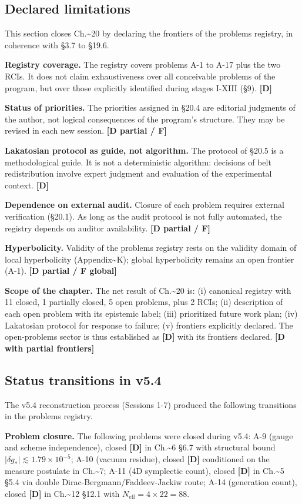 ﻿\documentclass[11pt,letterpaper]{article}
\begin{document}
\subsection{Declared limitations}
This section closes Ch.\textasciitilde{}20 by declaring the frontiers of the problems registry, in coherence with §3.7 to §19.6.

\textbf{Registry coverage.} The registry covers problems A-1 to A-17 plus the two RCIs. It does not claim exhaustiveness over all conceivable problems of the program, but over those explicitly identified during stages I-XIII (§9). \textbf{[D]}

\textbf{Status of priorities.} The priorities assigned in §20.4 are editorial judgments of the author, not logical consequences of the program's structure. They may be revised in each new session. \textbf{[D partial / F]}

\textbf{Lakatosian protocol as guide, not algorithm.} The protocol of §20.5 is a methodological guide. It is not a deterministic algorithm: decisions of belt redistribution involve expert judgment and evaluation of the experimental context. \textbf{[D]}

\textbf{Dependence on external audit.} Closure of each problem requires external verification (§20.1). As long as the audit protocol is not fully automated, the registry depends on auditor availability. \textbf{[D partial / F]}

\textbf{Hyperbolicity.} Validity of the problems registry rests on the validity domain of local hyperbolicity (Appendix\textasciitilde{}K); global hyperbolicity remains an open frontier (A-1). \textbf{[D partial / F global]}

\textbf{Scope of the chapter.} The net result of Ch.\textasciitilde{}20 is: (i) canonical registry with 11 closed, 1 partially closed, 5 open problems, plus 2 RCIs; (ii) description of each open problem with its epistemic label; (iii) prioritized future work plan; (iv) Lakatosian protocol for response to failure; (v) frontiers explicitly declared. The open-problems sector is thus established as \textbf{[D]} with its frontiers declared. \textbf{[D with partial frontiers]}
\subsection{Status transitions in v5.4}
The v5.4 reconstruction process (Sessions 1-7) produced the following transitions in the problems registry.

\textbf{Problem closure.} The following problems were closed during v5.4: A-9 (gauge and scheme independence), closed \textbf{[D]} in Ch.\textasciitilde{}6 §6.7 with structural bound $|\delta g_*| \lesssim 1{.}79 \times 10^{-5}$; A-10 (vacuum residue), closed \textbf{[D]} conditioned on the measure postulate in Ch.\textasciitilde{}7; A-11 (4D symplectic count), closed \textbf{[D]} in Ch.\textasciitilde{}5 §5.4 via double Dirac-Bergmann/Faddeev-Jackiw route; A-14 (generation count), closed \textbf{[D]} in Ch.\textasciitilde{}12 §12.1 with $N_{\text{eff}} = 4 \times 22 = 88$.
\end{document}
